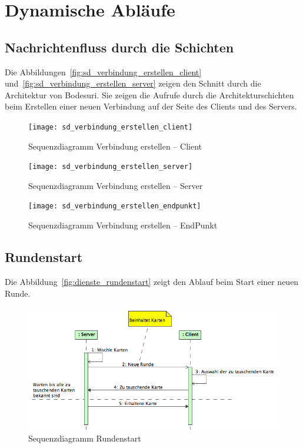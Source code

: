 \documentclass[12pt,halfparskip]{scrartcl}
\begin{document}
\clearpage
\section{Dynamische Abläufe}

\subsection{Nachrichtenfluss durch die Schichten}

Die Abbildungen~\vref{fig:sd_verbindung_erstellen_client} und~\vref{fig:sd_verbindung_erstellen_server} zeigen den Schnitt durch die Architektur von Bodesuri. Sie zeigen die Aufrufe durch die Architekturschichten beim Erstellen einer neuen Verbindung auf der Seite des Clients und des Servers.
\begin{figure}[h]
	\centering
	\texttt{[image: sd\_verbindung\_erstellen\_client]}
	\caption{Sequenzdiagramm Verbindung erstellen -- Client}
	\label{fig:sd_verbindung_erstellen_client}
\end{figure}
\begin{figure}[h]
	\centering
	\texttt{[image: sd\_verbindung\_erstellen\_server]}
	\caption{Sequenzdiagramm Verbindung erstellen -- Server}
	\label{fig:sd_verbindung_erstellen_server}
\end{figure}

\begin{figure}[h]
	\centering
	\texttt{[image: sd\_verbindung\_erstellen\_endpunkt]}
	\caption{Sequenzdiagramm Verbindung erstellen -- EndPunkt}
	\label{fig:sd_verbindung_erstellen_endpunkt}
\end{figure}

\subsection{Rundenstart}
\label{sub:rundenstart}
Die Abbildung~\vref{fig:dienste_rundenstart} zeigt den Ablauf beim Start einer neuen Runde.
\begin{figure}[h]
	\centering
	\includegraphics[width=0.7 \textwidth]{dienste_rundenstart}
	\caption{Sequenzdiagramm Rundenstart}
	\label{fig:dienste_rundenstart}
\end{figure}
\end{document}
